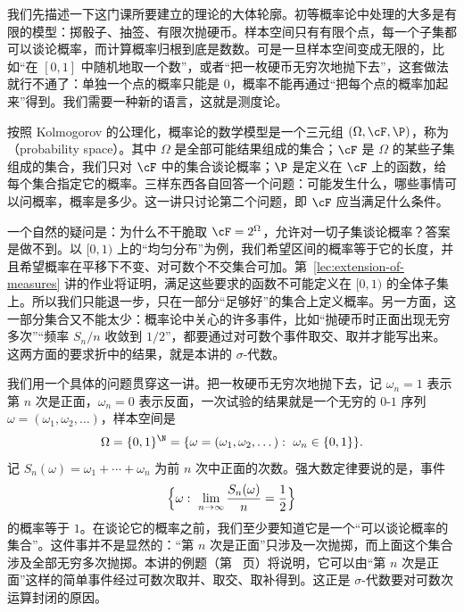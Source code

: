 \label{lec:set-systems}

我们先描述一下这门课所要建立的理论的大体轮廓。初等概率论中处理的大多是有限的模型：掷骰子、抽签、有限次抛硬币。样本空间只有有限个点，每一个子集都可以谈论概率，而计算概率归根到底是数数。可是一旦样本空间变成无限的，比如“在 $[0,1]$ 中随机地取一个数”，或者“把一枚硬币无穷次地抛下去”，这套做法就行不通了：单独一个点的概率只能是 $0$，概率不能再通过“把每个点的概率加起来”得到。我们需要一种新的语言，这就是测度论。

按照 Kolmogorov 的公理化，概率论的数学模型是一个三元组 $(\Omega,\cF,\P)$，称为（probability space）。其中 $\Omega$ 是全部可能结果组成的集合；$\cF$ 是 $\Omega$ 的某些子集组成的集合，我们只对 $\cF$ 中的集合谈论概率；$\P$ 是定义在 $\cF$ 上的函数，给每个集合指定它的概率。三样东西各自回答一个问题：可能发生什么，哪些事情可以问概率，概率是多少。这一讲只讨论第二个问题，即 $\cF$ 应当满足什么条件。

一个自然的疑问是：为什么不干脆取 $\cF=2^\Omega$，允许对一切子集谈论概率？答案是做不到。以 $[0,1)$ 上的“均匀分布”为例，我们希望区间的概率等于它的长度，并且希望概率在平移下不变、对可数个不交集合可加。第~\ref{lec:extension-of-measures} 讲的作业将证明，满足这些要求的函数不可能定义在 $[0,1)$ 的全体子集上。所以我们只能退一步，只在一部分“足够好”的集合上定义概率。另一方面，这一部分集合又不能太少：概率论中关心的许多事件，比如“抛硬币时正面出现无穷多次”“频率 $S_n/n$ 收敛到 $1/2$”，都要通过对可数个事件取交、取并才能写出来。这两方面的要求折中的结果，就是本讲的 $\sigma$-代数。

我们用一个具体的问题贯穿这一讲。把一枚硬币无穷次地抛下去，记 $\omega_n=1$ 表示第 $n$ 次是正面，$\omega_n=0$ 表示反面，一次试验的结果就是一个无穷的 $0$-$1$ 序列 $\omega=(\omega_1,\omega_2,\dots)$，样本空间是
\[
\Omega=\{0,1\}^{\N}=\{\omega=(\omega_1,\omega_2,\dots):\ \omega_n\in\{0,1\}\}.
\]
记 $S_n(\omega)=\omega_1+\cdots+\omega_n$ 为前 $n$ 次中正面的次数。强大数定律要说的是，事件
\[
\Bigl\{\omega:\ \lim_{n\to\infty}\frac{S_n(\omega)}n=\frac12\Bigr\}
\]
的概率等于 $1$。在谈论它的概率之前，我们至少要知道它是一个“可以谈论概率的集合”。这件事并不是显然的：“第 $n$ 次是正面”只涉及一次抛掷，而上面这个集合涉及全部无穷多次抛掷。本讲的例题（第~\pageref{we:set-systems:slln-event} 页）将说明，它可以由“第 $n$ 次是正面”这样的简单事件经过可数次取并、取交、取补得到。这正是 $\sigma$-代数要对可数次运算封闭的原因。

